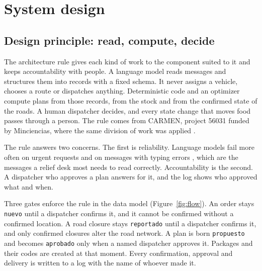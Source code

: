 \documentclass[11pt]{article}
\newcommand{\code}[1]{\texttt{\small #1}}
\begin{document}
\section{System design}\label{sec:system}

\subsection{Design principle: read, compute, decide}

The architecture rule gives each kind of work to the component suited to it and keeps accountability with people. A language model reads messages and structures them into records with a fixed schema. It never assigns a vehicle, chooses a route or dispatches anything. Deterministic code and an optimizer compute plans from those records, from the stock and from the confirmed state of the roads. A human dispatcher decides, and every state change that moves food passes through a person. The rule comes from CARMEN, project 56031 funded by Minciencias, where the same division of work was applied \citep{PORVERIFICAR_carmen}. %

The rule answers two concerns. The first is reliability. Language models fail more often on urgent requests and on messages with typing errors \citep{imran2025robustness}, which are the messages a relief desk most needs to read correctly. Accountability is the second. A dispatcher who approves a plan answers for it, and the log shows who approved what and when.

Three gates enforce the rule in the data model (Figure~\ref{fig:flow}). An order stays \code{nuevo} until a dispatcher confirms it, and it cannot be confirmed without a confirmed location. A road closure stays \code{reportado} until a dispatcher confirms it, and only confirmed closures alter the road network. A plan is born \code{propuesto} and becomes \code{aprobado} only when a named dispatcher approves it. Packages and their codes are created at that moment. Every confirmation, approval and delivery is written to a log with the name of whoever made it.
\end{document}
